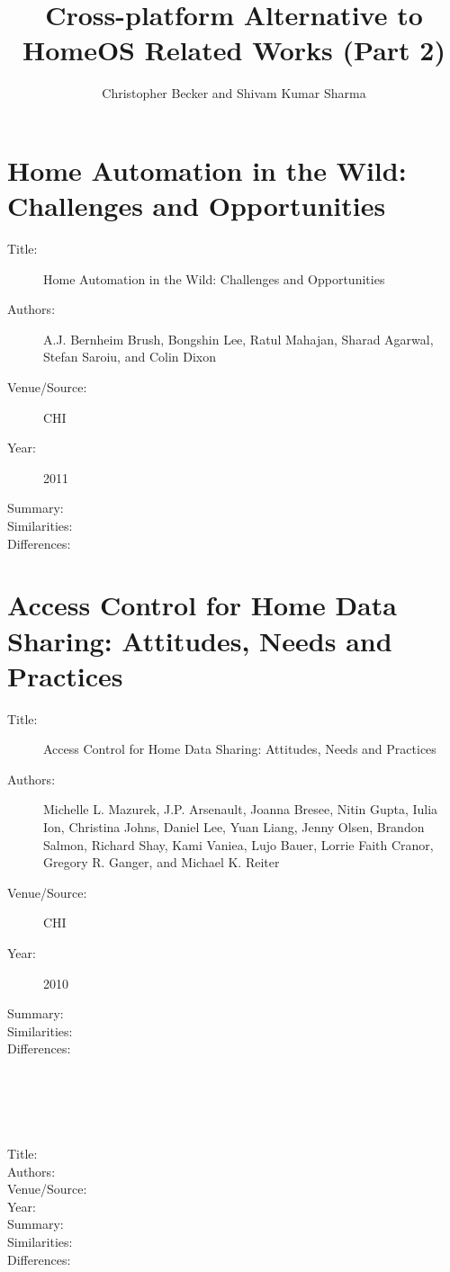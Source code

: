 \documentclass[letterpaper,12pt]{article}
\title{Cross-platform Alternative to HomeOS Related Works (Part 2)}
\author{Christopher Becker and Shivam Kumar Sharma}
\begin{document}
\maketitle

\section{Home Automation in the Wild: Challenges and Opportunities~\cite{}}
\begin{description}
 \item[Title:] Home Automation in the Wild: Challenges and Opportunities
 \item[Authors:] A.J. Bernheim Brush, Bongshin Lee, Ratul Mahajan, Sharad Agarwal, Stefan Saroiu, and Colin Dixon
 \item[Venue/Source:] CHI
 \item[Year:] 2011
 \item[Summary:] 
 \item[Similarities:] 
 \item[Differences:] 
\end{description}

\section{Access Control for Home Data Sharing: Attitudes, Needs and Practices~\cite{}}
\begin{description}
 \item[Title:] Access Control for Home Data Sharing: Attitudes, Needs and Practices
 \item[Authors:] Michelle L. Mazurek, J.P. Arsenault, Joanna Bresee, Nitin Gupta, Iulia Ion, Christina Johns, Daniel Lee, Yuan Liang, Jenny Olsen, Brandon Salmon, Richard Shay, Kami Vaniea, Lujo Bauer, Lorrie Faith Cranor, Gregory R. Ganger, and Michael K. Reiter
 \item[Venue/Source:] CHI
 \item[Year:] 2010
 \item[Summary:] 
 \item[Similarities:] 
 \item[Differences:] 
\end{description}

\section{~\cite{}}
\begin{description}
 \item[Title:] 
 \item[Authors:] 
 \item[Venue/Source:] 
 \item[Year:] 
 \item[Summary:] 
 \item[Similarities:] 
 \item[Differences:] 
\end{description}
\end{document}
